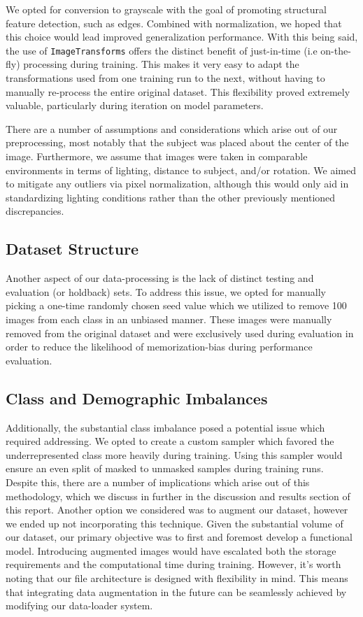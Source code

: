 \documentclass{article}
\begin{document}
We opted for conversion to grayscale with the goal of promoting structural feature detection, such as edges. Combined with normalization, we hoped that this choice would lead improved generalization performance. With this being said, the use of \texttt{ImageTransforms} offers the distinct benefit of just-in-time (i.e on-the-fly) processing during training. This makes it very easy to adapt the transformations used from one training run to the next, without having to manually re-process the entire original dataset. This flexibility proved extremely valuable, particularly during iteration on model parameters.

There are a number of assumptions and considerations which arise out of our preprocessing,  most notably that the subject was placed about the center of the image. Furthermore, we assume that images were taken in comparable environments in terms of lighting, distance to subject, and/or rotation. We aimed to mitigate any outliers via pixel normalization, although this would only aid in standardizing lighting conditions rather than the other previously mentioned discrepancies.

\subsection{Dataset Structure}

Another aspect of our data-processing is the lack of distinct testing and evaluation (or holdback) sets. To address this issue, we opted for manually picking a one-time randomly chosen seed value which we utilized to remove 100 images from each class in an unbiased manner. These images were manually removed from the original dataset and were exclusively used during evaluation in order to reduce the likelihood of memorization-bias during performance evaluation.

\subsection{Class and Demographic Imbalances}

Additionally, the substantial class imbalance posed a potential issue which required addressing. We opted to create a custom sampler which favored the underrepresented class more heavily during training. Using this sampler would ensure an even split of masked to unmasked samples during training runs. Despite this, there are a number of implications which arise out of this methodology, which we discuss in further in the discussion and results section of this report. Another option we considered was to augment our dataset, however we ended up not incorporating this technique. Given the substantial volume of our dataset, our primary objective was to first and foremost develop a functional model. Introducing augmented images would have escalated both the storage requirements and the computational time during training. However, it's worth noting that our file architecture is designed with flexibility in mind. This means that integrating data augmentation in the future can be seamlessly achieved by modifying our data-loader system.
\end{document}
